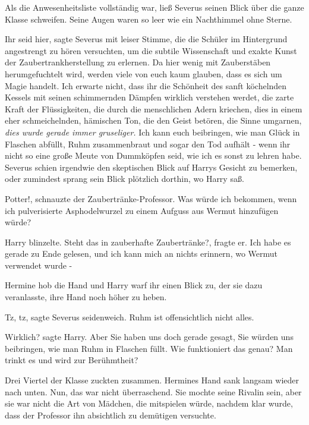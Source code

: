 Als die Anwesenheitsliste vollständig war, ließ Severus seinen Blick über die
ganze Klasse schweifen. Seine Augen waren so leer wie ein Nachthimmel ohne
Sterne.

\glqq Ihr seid hier\grqq{}, sagte Severus mit leiser Stimme, die die Schüler im
Hintergrund angestrengt zu hören versuchten, \glqq um die subtile Wissenschaft
und exakte Kunst der Zaubertrankherstellung zu erlernen. Da hier wenig mit
Zauberstäben herumgefuchtelt wird, werden viele von euch kaum glauben, dass es
sich um Magie handelt. Ich erwarte nicht, dass ihr die Schönheit des sanft
köchelnden Kessels mit seinen schimmernden Dämpfen wirklich verstehen werdet,
die zarte Kraft der Flüssigkeiten, die durch die menschlichen Adern
kriechen\grqq{}, dies in einem eher schmeichelnden, hämischen Ton, \glqq die den
Geist betören, die Sinne umgarnen\grqq{}, \emph{dies wurde gerade immer
gruseliger.} \glqq Ich kann euch beibringen, wie man Glück in Flaschen abfüllt,
Ruhm zusammenbraut und sogar den Tod aufhält - wenn ihr nicht so eine große
Meute von Dummköpfen seid, wie ich es sonst zu lehren habe.\grqq{} Severus
schien irgendwie den skeptischen Blick auf Harrys Gesicht zu bemerken, oder
zumindest sprang sein Blick plötzlich dorthin, wo Harry saß.

\glqq Potter!\grqq{}, schnauzte der Zaubertränke-Professor. \glqq Was würde ich
bekommen, wenn ich pulverisierte Asphodelwurzel zu einem Aufguss aus Wermut
hinzufügen würde?\grqq{}

Harry blinzelte. \glqq Steht das in zauberhafte Zaubertränke?\grqq{}, fragte er.
\glqq Ich habe es gerade zu Ende gelesen, und ich kann mich an nichts erinnern,
wo Wermut verwendet wurde -\grqq{}

Hermine hob die Hand und Harry warf ihr einen Blick zu, der sie dazu
veranlasste, ihre Hand noch höher zu heben.

\glqq Tz, tz\grqq{}, sagte Severus seidenweich. \glqq Ruhm ist offensichtlich
nicht alles.\grqq{}

\glqq Wirklich?\grqq{} sagte Harry. \glqq Aber Sie haben uns doch gerade gesagt,
Sie würden uns beibringen, wie man Ruhm in Flaschen füllt. Wie funktioniert das
genau? Man trinkt es und wird zur Berühmtheit?\grqq{}

Drei Viertel der Klasse zuckten zusammen. Hermines Hand sank langsam wieder nach
unten. Nun, das war nicht überraschend. Sie mochte seine Rivalin sein, aber sie
war nicht die Art von Mädchen, die mitspielen würde, nachdem klar wurde, dass
der Professor ihn absichtlich zu demütigen versuchte.


